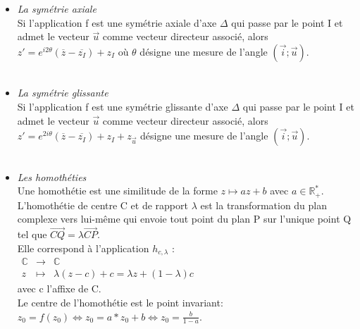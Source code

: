 \documentclass[a4paper,10pt]{book}
\newcommand{\Rpe}{\mathbb{R}_{+}^{*}}
\newcommand{\C}{\mathbb{C}}
\begin{document}
\begin{itemize}
\item \emph{La symétrie axiale}\\

Si l’application f est une symétrie axiale d’axe $\Delta$ qui passe par le point I et admet le vecteur $\vec{u}$ comme vecteur directeur associé, alors $z'=e^{i2\theta}(\overline{z}-\overline{z_{I}})+z_{I}$ où $\theta$ désigne une mesure de l’angle $(\vec{i};\vec{u})$.\\\\

\item \emph{La symétrie glissante}\\

Si l’application f est une symétrie glissante d’axe $\Delta$ qui passe par le point I et admet le vecteur $\vec{u}$ comme vecteur directeur associé, alors $z'=e^{2i\theta}(\overline{z}-\overline{z_{I}})+z_{I}+z_{\vec{u}}$ désigne une mesure de l’angle $(\vec{i};\vec{u})$.\\\\

\item \emph{Les homothéties}\\

Une homothétie est une similitude de la forme $z \longmapsto az+b$ avec $a \in \Rpe$.\\

L'homothétie de centre C et de rapport $\lambda$ est la transformation du plan complexe vers lui-même qui envoie tout point du plan P sur l'unique point Q tel que $\overset{\longrightarrow}{CQ}=\lambda\overset{\longrightarrow}{CP}$.\\

Elle correspond à l'application $h_{c,\lambda}$ : $\begin{array}{rcl} \C &\longrightarrow &\C \\ z &\longmapsto &\lambda(z-c)+c=\lambda z+(1-\lambda)c \end{array}$\\
avec c l'affixe de C.\\

Le centre de l'homothétie est le point invariant: $z_{0}=f(z_{0}) \Leftrightarrow z_{0}=a*z_{0}+b \Leftrightarrow z_{0}=\frac{b}{1-a}$.
\end{itemize} \newpage
\end{document}
